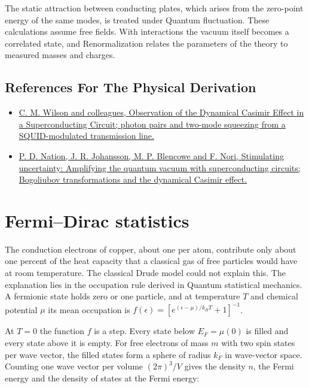 \documentclass[11pt,oneside]{book}
\begin{document}
The static attraction between conducting plates, which arises from the zero-point energy of the same modes, is treated under Quantum fluctuation. These calculations assume free fields. With interactions the vacuum itself becomes a correlated state, and Renormalization relates the parameters of the theory to measured masses and charges.

\subsection*{References For The Physical Derivation}
\begin{itemize}
\item \href{https://arxiv.org/abs/1105.4714}{C. M. Wilson and colleagues, Observation of the Dynamical Casimir Effect in a Superconducting Circuit; photon pairs and two-mode squeezing from a SQUID-modulated transmission line.}
\item \href{https://arxiv.org/abs/1103.0835}{P. D. Nation, J. R. Johansson, M. P. Blencowe and F. Nori, Stimulating uncertainty: Amplifying the quantum vacuum with superconducting circuits; Bogoliubov transformations and the dynamical Casimir effect.}
\end{itemize}





\clearpage

\section{Fermi–Dirac statistics}

\label{topic:fermi-dirac-statistics}

The conduction electrons of copper, about one per atom, contribute only about one percent of the heat capacity that a classical gas of free particles would have at room temperature. The classical Drude model could not explain this. The explanation lies in the occupation rule derived in Quantum statistical mechanics. A fermionic state holds zero or one particle, and at temperature \(T\) and chemical potential \(\mu\) its mean occupation is \(f(\epsilon)=[e^{(\epsilon-\mu)/k_BT}+1]^{-1}\).

At \(T=0\) the function \(f\) is a step. Every state below \(E_F=\mu(0)\) is filled and every state above it is empty. For free electrons of mass \(m\) with two spin states per wave vector, the filled states form a sphere of radius \(k_F\) in wave-vector space. Counting one wave vector per volume \((2\pi)^3/V\) gives the density \(n\), the Fermi energy and the density of states at the Fermi energy:
\end{document}
